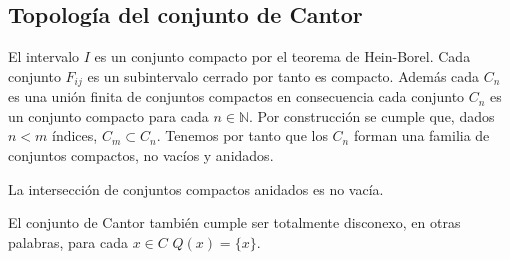 \subsection*{Topología del conjunto de Cantor}

El intervalo $I$ es un conjunto compacto por el teorema de Hein-Borel. Cada conjunto $F_{ij}$ es un subintervalo cerrado por tanto es compacto. Además cada $C_n$ es una unión finita de conjuntos compactos en consecuencia cada conjunto $C_n$ es un conjunto compacto para cada $n \in \mathbb{N}$. Por construcción se cumple que, dados $n < m $ índices, $C_m \subset C_n$. Tenemos por tanto que los $C_n$ forman una familia de conjuntos compactos, no vacíos y anidados. 

\begin{lm}
La intersección de conjuntos compactos anidados es no vacía. 
\end{lm} 

El conjunto de Cantor también cumple ser totalmente disconexo, en otras palabras, para cada $x \in C$ $Q(x)=\{x\}$. 
 

 
 
 
